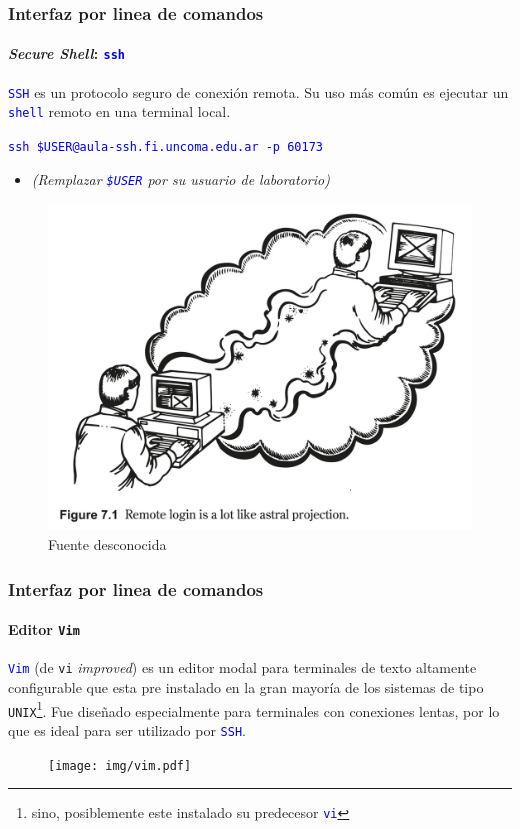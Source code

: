 \documentclass[11pt,a4paper,spanish]{beamer}
\newcommand{\codeword}[1]{\mbox{\texttt{\textcolor{blue}{#1}}}}
\begin{document}
\begin{frame}

    \frametitle{Interfaz por linea de comandos}
    \framesubtitle{\emph{Secure Shell}: \codeword{ssh}}
    
    \codeword{SSH} es un protocolo seguro de conexión remota. Su uso más
    común es ejecutar un \codeword{shell} remoto en una terminal local.

        \codeword{ssh \$USER@aula-ssh.fi.uncoma.edu.ar -p 60173}
        \begin{itemize}
            \item[] \tiny{\emph{(Remplazar \codeword{\$USER} por su usuario
                de laboratorio)}}
        \end{itemize}

    \begin{figure}
    \centering
    \includegraphics[height=0.6\textheight]{img/ssh.png}
        \captionsetup{textfont=tiny,labelformat=empty}
        \caption{Fuente desconocida}
    \end{figure}

\end{frame}

\begin{frame}

    \frametitle{Interfaz por linea de comandos}
    \framesubtitle{Editor \texttt{Vim}}
    
    \codeword{Vim} (de \texttt{vi} \emph{improved}) es un editor modal para
    terminales de texto altamente configurable que esta pre instalado en la
    gran mayoría de los sistemas de tipo \texttt{UNIX}\footnote{sino,
    posiblemente este instalado su predecesor \codeword{vi}}. Fue diseñado
    especialmente para terminales con conexiones lentas, por lo que es ideal
    para ser utilizado por \codeword{SSH}.

    \begin{figure}
    \centering
    \texttt{[image: img/vim.pdf]}
    \end{figure}

\end{frame}
\end{document}
